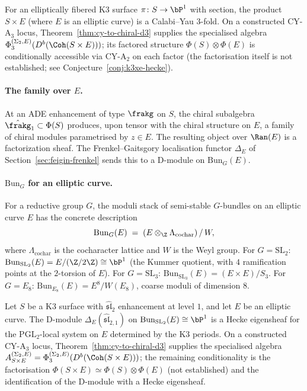 For an elliptically fibered K3 surface $\pi\colon S \to \bP^1$ with section, the product $S \times E$ (where $E$ is an elliptic curve) is a Calabi--Yau $3$-fold. On a constructed CY-A$_3$ locus, Theorem~\ref{thm:cy-to-chiral-d3} supplies the specialised algebra \(\Phi_3^{(\Sigma_2,E)}(D^b(\Coh(S\times E)))\); its factored structure $\Phi(S) \otimes \Phi(E)$ is conditionally accessible via CY-A$_2$ on each factor (the factorisation itself is not established; see Conjecture~\ref{conj:k3xe-hecke}).

\paragraph{The family over \texorpdfstring{$E$}{E}.}
At an ADE enhancement of type $\frakg$ on $S$, the chiral subalgebra $\hat{\frakg}_1 \subset \Phi(S)$ produces, upon tensor with the chiral structure on $E$, a family of chiral modules parametrised by $z \in E$. The resulting object over $\Ran(E)$ is a factorization sheaf. The Frenkel--Gaitsgory localisation functor $\Delta_E$ of Section~\ref{sec:feigin-frenkel} sends this to a D-module on $\mathrm{Bun}_G(E)$.

\paragraph{\texorpdfstring{$\mathrm{Bun}_G$}{Bun-G} for an elliptic curve.}
For a reductive group $G$, the moduli stack of semi-stable $G$-bundles on an elliptic curve $E$ has the concrete description
\[
 \mathrm{Bun}_G(E) \;=\; (E \otimes_\Z \Lambda_{\mathrm{cochar}}) \,/\, W,
\]
where $\Lambda_{\mathrm{cochar}}$ is the cocharacter lattice and $W$ is the Weyl group. For $G = \mathrm{SL}_2$: $\mathrm{Bun}_{\mathrm{SL}_2}(E) = E / (\Z/2\Z) \cong \bP^1$ (the Kummer quotient, with $4$ ramification points at the $2$-torsion of $E$). For $G = \mathrm{SL}_3$: $\mathrm{Bun}_{\mathrm{SL}_3}(E) = (E \times E) / S_3$. For $G = E_8$: $\mathrm{Bun}_{E_8}(E) = E^8 / W(E_8)$, coarse moduli of dimension $8$.

\begin{conjecture}
\label{conj:k3xe-hecke}
\ClaimStatusConjectured
Let $S$ be a K3 surface with $\hat{\mathfrak{sl}}_2$ enhancement at level $1$, and let $E$ be an elliptic curve. The D-module $\Delta_E(\hat{\mathfrak{sl}}_{2,1})$ on $\mathrm{Bun}_{\mathrm{SL}_2}(E) \cong \bP^1$ is a Hecke eigensheaf for the $\mathrm{PGL}_2$-local system on $E$ determined by the K3 periods. On a constructed CY-A$_3$ locus, Theorem~\ref{thm:cy-to-chiral-d3} supplies the specialised algebra \(A_{S\times E}^{(\Sigma_2,E)}=\Phi_3^{(\Sigma_2,E)}(D^b(\Coh(S\times E)))\); the remaining conditionality is the factorisation \(\Phi(S\times E)\simeq \Phi(S)\otimes\Phi(E)\) (not established) and the identification of the D-module with a Hecke eigensheaf.
\end{conjecture}

